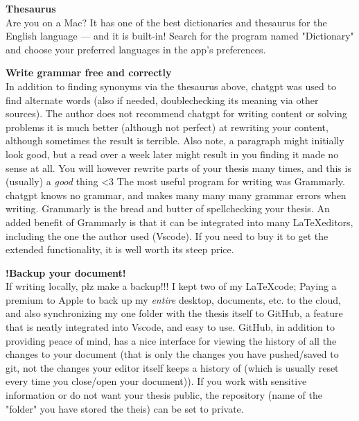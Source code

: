 \documentclass[../thesis.tex]{subfiles}
\begin{document}



\textbf{Thesaurus}\\
Are you on a Mac? It has one of the best dictionaries and thesaurus for the English language — and it is built-in! Search for the program named "Dictionary" and choose your preferred languages in the app's preferences.  


\textbf{Write grammar free and correctly}\\
In addition to finding synonyms via the thesaurus above, chatgpt was used to find alternate words (also if needed, doublechecking its meaning via other sources). The author does not recommend chatgpt for writing content or solving problems it is much better (although not perfect) at rewriting your content, although sometimes the result is terrible. Also note, a paragraph might initially look good, but a read over a week later might result in you finding it made no sense at all. You will however rewrite parts of your thesis many times, and this is (usually) a \emph{good} thing <3
The most useful program for writing was Grammarly. chatgpt knows no grammar, and makes many many many grammar errors when writing. Grammarly is the bread and butter of spellchecking your thesis. An added benefit of Grammarly is that it can be integrated into many \LaTeX editors, including the one the author used (Vscode). If you need to buy it to get the extended functionality, it is well worth its steep price. 


\textbf{!Backup your document!}\\
If writing locally, plz make a backup!!! I kept two of my \LaTeX code; Paying a premium to Apple to back up my \emph{entire} desktop, documents, etc. to the cloud, and also synchronizing my one folder with the thesis itself to GitHub, a feature that is neatly integrated into Vscode, and easy to use.
GitHub, in addition to providing peace of mind, has a nice interface for viewing the history of all the changes to your document (that is only the changes you have pushed/saved to git, not the changes your editor itself keeps a history of (which is usually reset every time you close/open your document)). If you work with sensitive information or do not want your thesis public, the repository (name of the "folder" you have stored the theis) can be set to private.
\end{document}
